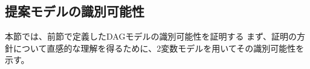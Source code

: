 
\subsection{提案モデルの識別可能性}

本節では、前節で定義したDAGモデルの識別可能性を証明する
まず、証明の方針について直感的な理解を得るために、2変数モデルを用いてその識別可能性を示す。
